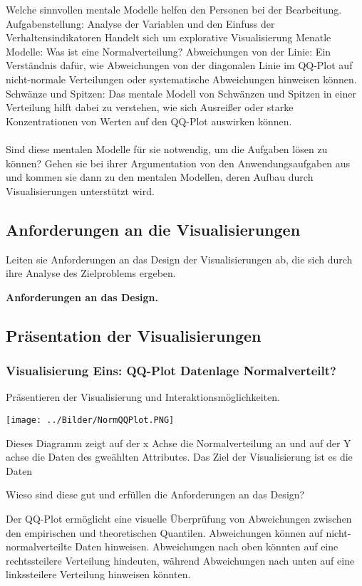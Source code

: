 \documentclass[usegeometry=true]{scrartcl}
\begin{document}
Welche sinnvollen mentale Modelle helfen den Personen bei der Bearbeitung. 
Aufgabenstellung: Analyse der Variablen und den Einfuss der Verhaltensindikatoren
Handelt sich um explorative Visualisierung 
Menatle Modelle: Was ist eine Normalverteilung? 
Abweichungen von der Linie:
  Ein Verständnis dafür, wie Abweichungen von der diagonalen Linie im QQ-Plot auf nicht-normale Verteilungen oder systematische Abweichungen hinweisen können.
  Schwänze und Spitzen:
Das mentale Modell von Schwänzen und Spitzen in einer Verteilung hilft dabei zu verstehen, wie sich Ausreißer oder starke Konzentrationen von Werten auf den QQ-Plot auswirken können.
\\
\\

Sind diese mentalen Modelle für sie notwendig, um die Aufgaben lösen zu können? 
Gehen sie bei ihrer Argumentation von den Anwendungsaufgaben aus und kommen sie dann zu den mentalen Modellen, deren Aufbau durch Visualisierungen unterstützt wird. 
\subsection{Anforderungen an die Visualisierungen}
Leiten sie Anforderungen an das Design der Visualisierungen ab, die sich durch ihre Analyse des Zielproblems ergeben.

\textbf{ Anforderungen an das Design. }
\subsection{Präsentation der Visualisierungen}

\subsubsection{Visualisierung Eins: QQ-Plot Datenlage Normalverteilt?}

Präsentieren der Visualisierung und Interaktionsmöglichkeiten. 

\texttt{[image: ../Bilder/NormQQPlot.PNG]}


Dieses Diagramm zeigt auf der x Achse die Normalverteilung an und auf der Y achse die Daten des gweählten Attributes.
Das Ziel der Visualisierung ist es die Daten

Wieso sind diese gut und erfüllen die Anforderungen an das Design?

 Der QQ-Plot ermöglicht eine visuelle Überprüfung von Abweichungen zwischen den empirischen
 und theoretischen Quantilen. Abweichungen können auf nicht-normalverteilte Daten hinweisen.
 Abweichungen nach oben könnten auf eine rechtssteilere Verteilung hindeuten, während Abweichungen 
 nach unten auf eine linkssteilere Verteilung hinweisen könnten.
\end{document}

